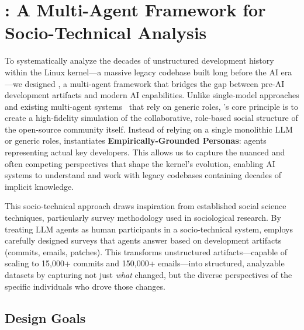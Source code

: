 
\section{\sys: A Multi-Agent Framework for Socio-Technical Analysis}

To systematically analyze the decades of unstructured development history within the Linux kernel—a massive legacy codebase built long before the AI era—we designed \sys, a multi-agent framework that bridges the gap between pre-AI development artifacts and modern AI capabilities. Unlike single-model approaches and existing multi-agent systems~\cite{lmase2024,agent4se2024} that rely on generic roles, \sys's core principle is to create a high-fidelity simulation of the collaborative, role-based social structure of the open-source community itself. Instead of relying on a single monolithic LLM or generic roles, \sys instantiates \textbf{Empirically-Grounded Personas}: agents representing actual key developers. This allows us to capture the nuanced and often competing perspectives that shape the kernel's evolution, enabling AI systems to understand and work with legacy codebases containing decades of implicit knowledge.

This socio-technical approach draws inspiration from established social science techniques, particularly survey methodology used in sociological research. By treating LLM agents as human participants in a socio-technical system, \sys employs carefully designed surveys that agents answer based on development artifacts (commits, emails, patches). This transforms unstructured artifacts—capable of scaling to 15,000+ commits and 150,000+ emails—into structured, analyzable datasets by capturing not just \emph{what} changed, but the diverse perspectives of the specific individuals who drove those changes.

\subsection{Design Goals}

